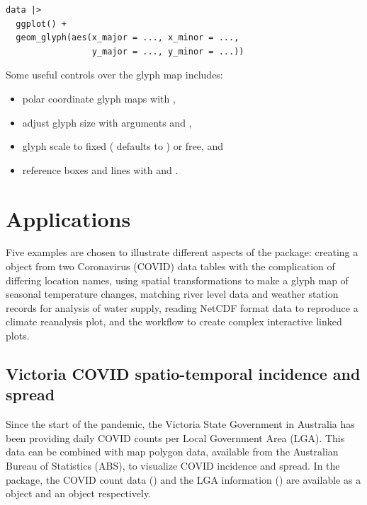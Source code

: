 \documentclass[
  shortnames]{jss}
\providecommand{\tightlist}{%
  \setlength{\itemsep}{0pt}\setlength{\parskip}{0pt}}
\begin{document}
\begin{verbatim}
data |> 
  ggplot() +
  geom_glyph(aes(x_major = ..., x_minor = ..., 
                 y_major = ..., y_minor = ...))
\end{verbatim}

Some useful controls over the glyph map includes:

\begin{itemize}
\tightlist
\item
  polar coordinate glyph maps with ,
\item
  adjust glyph size with arguments  and ,
\item
  glyph scale to fixed ( defaults to ) or free, and
\item
  reference boxes and lines with  and .
\end{itemize}

\hypertarget{examples}{%
\section{Applications}\label{examples}}

Five examples are chosen to illustrate different aspects of the  package: creating a  object from two Coronavirus (COVID) data tables with the complication of differing location names, using spatial transformations to make a glyph map of seasonal temperature changes, matching river level data and weather station records for analysis of water supply, reading NetCDF format data to reproduce a climate reanalysis plot, and the workflow to create complex interactive linked plots.

\hypertarget{covid}{%
\subsection{Victoria COVID spatio-temporal incidence and spread}\label{covid}}

Since the start of the pandemic, the Victoria State Government in Australia has been providing daily COVID counts per Local Government Area (LGA). This data can be combined with map polygon data, available from the Australian Bureau of Statistics (ABS), to visualize COVID incidence and spread. In the  package, the COVID count data () and the LGA information () are available as a  object and an  object respectively.
\end{document}
